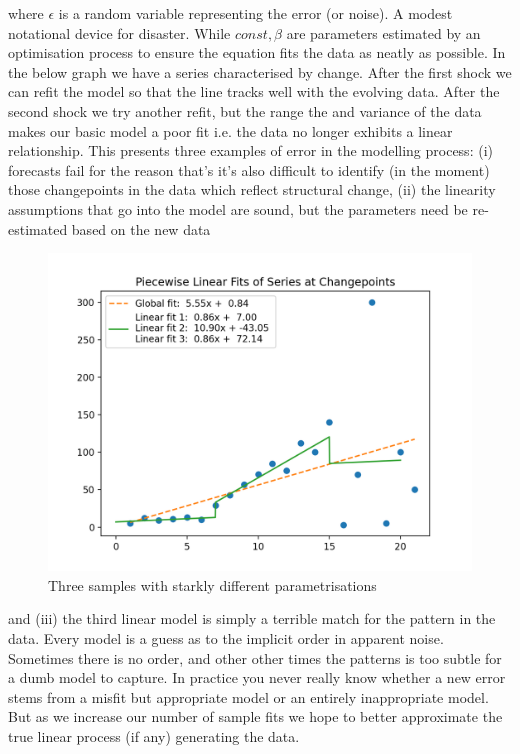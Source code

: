 \documentclass[10pt,a4paper,notitlepage, twocolumn]{article}
\begin{document}
\noindent where $\epsilon$ is a random variable representing the error (or noise). A modest notational device for disaster. While $const, \beta$ are parameters estimated by an optimisation process to ensure the equation fits the data as neatly as possible. In the below graph we have a series characterised by change. After the first shock we can refit the model so that the line tracks well with the evolving data. After the second shock we try another refit, but the range the and variance of the data makes our basic model a poor fit i.e. the data no longer exhibits a linear relationship. This presents three examples of error in the modelling process: (i) forecasts fail for the reason that's it's also difficult to identify (in the moment) those changepoints in the data which reflect structural change, (ii)  the linearity assumptions that go into the model are sound, but the parameters need be re-estimated based on the new data
\begin{figure}[H]
  \includegraphics[width=\linewidth]{./Plots/piecewise_linear_fits.png}
  \caption{Three samples with starkly different parametrisations}
\end{figure}
and (iii) the third linear model is simply a terrible match for the pattern in the data. Every model is a guess as to the implicit order in apparent noise. Sometimes there is no order, and other other times the patterns is too subtle for a dumb model to capture. In practice you never really know whether a new error stems from a misfit but appropriate model or an entirely inappropriate model. But as we increase our number of sample fits we hope to better approximate the true linear process (if any) generating the data. 
\end{document}
